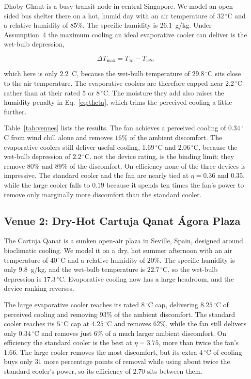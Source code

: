 \documentclass[11pt]{article}
\begin{document}
Dhoby Ghaut is a busy transit node in central Singapore. We model an open-sided
bus shelter there on a hot, humid day with an air temperature of $32\,^\circ$C
and a relative humidity of $85\%$. The specific humidity is $26.1$~g/kg. Under
Assumption~4 the maximum cooling an ideal evaporative cooler can deliver is the
wet-bulb depression,

\begin{equation}
\Delta T_{\max} = T_{\infty} - T_{wb},
\label{eq:depression}
\end{equation}

which here is only $2.2\,^\circ$C, because the wet-bulb temperature of
$29.8\,^\circ$C sits close to the air temperature. The evaporative coolers are
therefore capped near $2.2\,^\circ$C rather than at their rated $5$ or $8\,^\circ$C.
The moisture they add also raises the humidity penalty in
Eq.~\eqref{eq:theta}, which trims the perceived cooling a little further.

Table~\ref{tab:venues} lists the results. The fan achieves a perceived cooling
of $0.34\,^\circ$C from wind chill alone and removes $16\%$ of the ambient
discomfort. The evaporative coolers still deliver useful cooling, $1.69\,^\circ$C
and $2.06\,^\circ$C, because the wet-bulb depression of $2.2\,^\circ$C, not the
device rating, is the binding limit; they remove $80\%$ and $89\%$ of the
discomfort. On efficiency none of the three devices is impressive. The standard
cooler and the fan are nearly tied at $\eta=0.36$ and $0.35$, while the large
cooler falls to $0.19$ because it spends ten times the fan's power to remove
only marginally more discomfort than the standard cooler.

\subsection{Venue 2: Dry-Hot Cartuja Qanat \'Agora Plaza}

The Cartuja Qanat is a sunken open-air plaza in Seville, Spain, designed around
bioclimatic cooling. We model it on a dry, hot summer afternoon with an air
temperature of $40\,^\circ$C and a relative humidity of $20\%$. The specific
humidity is only $9.8$~g/kg, and the wet-bulb temperature is $22.7\,^\circ$C,
so the wet-bulb depression is $17.3\,^\circ$C. Evaporative cooling now has a
large headroom, and the device ranking reverses.

The large evaporative cooler reaches its rated $8\,^\circ$C cap, delivering
$8.25\,^\circ$C of perceived cooling and removing $93\%$ of the ambient
discomfort. The standard cooler reaches its $5\,^\circ$C cap at $4.25\,^\circ$C
and removes $62\%$, while the fan still delivers only $0.34\,^\circ$C and
removes just $6\%$ of a much larger ambient discomfort. On efficiency the
standard cooler is the best at $\eta=3.75$, more than twice the fan's $1.66$.
The large cooler removes the most discomfort, but its extra $4\,^\circ$C of
cooling buys only $31$ more percentage points of removal while using about twice
the standard cooler's power, so its efficiency of $2.70$ sits between them.
\end{document}

